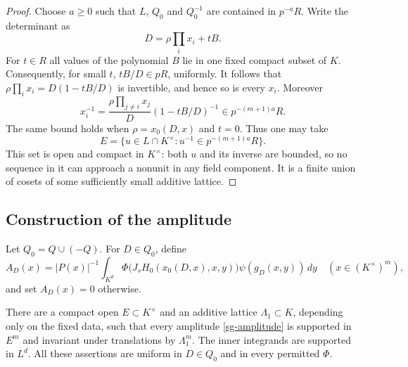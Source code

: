 \begin{proof}
Choose $a\ge0$ such that $L$, $Q_0$ and $Q_0^{-1}$ are
contained in $p^{-a}R$.  Write the determinant as
\[
             D=\rho\prod_i x_i+t B.
\]
For $t\in R$ all values of the polynomial $B$ lie in one
fixed compact subset of $K$.  Consequently, for small $t$,
$tB/D\in pR$, uniformly.  It follows that
$\rho\prod_i x_i=D(1-tB/D)$ is invertible, and hence so is
every $x_i$.  Moreover
\[
 x_i^{-1}=\frac{\rho\prod_{j\ne i}x_j}{D}
                           (1-tB/D)^{-1}
             \in p^{-(m+1)a}R.
\]
The same bound holds when $\rho=x_0(D,x)$ and $t=0$.
Thus one may take
\[
 E=\{u\in L\cap K^\times:u^{-1}\in p^{-(m+1)a}R\}.
\]
This set is open and compact in $K^\times$: both $u$ and its
inverse are bounded, so no sequence in it can approach a
nonunit in any field component.  It is a finite union of
cosets of some sufficiently small additive lattice.
\end{proof}

\subsection{Construction of the amplitude}

Let $Q_0=Q\cup(-Q)$.  For $D\in Q_0$, define
\begin{equation}\label{sg-amplitude}
 A_D(x)=|P(x)|^{-1}\int_{K^d}
   \Phi\bigl(J_sH_0(x_0(D,x),x,y)\bigr)
                          \psi(g_D(x,y))\,dy
 \quad(x\in(K^\times)^m),
\end{equation}
and set $A_D(x)=0$ otherwise.

\begin{lemma}\label{sg-amplitude-uniform}
There are a compact open $E\subset K^\times$ and an additive
lattice $\Lambda_1\subset K$, depending only on the fixed
data, such that every amplitude \eqref{sg-amplitude} is
supported in $E^m$ and invariant under translations by
$\Lambda_1^m$.  The inner integrands are supported in $L^d$.
All these assertions are uniform in $D\in Q_0$ and in every
permitted $\Phi$.
\end{lemma}

